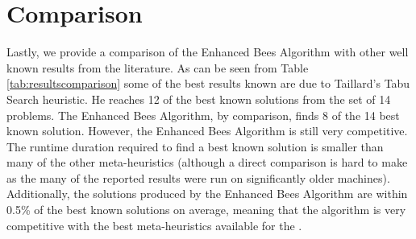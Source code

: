 \section{Comparison}
\label{sec:comparison}

Lastly, we provide a comparison of the Enhanced Bees Algorithm with other well known results from the literature. As can be seen from Table \ref{tab:resultscomparison} some of the best results known are due to Taillard's Tabu Search heuristic. He reaches 12 of the best known solutions from the set of 14 problems. The Enhanced Bees Algorithm, by comparison, finds 8 of the 14 best known solution. However, the Enhanced Bees Algorithm is still very competitive. The runtime duration required to find a best known solution is smaller than many of the other meta-heuristics (although a direct comparison is hard to make as the many of the reported results were run on significantly older machines). Additionally, the solutions produced by the Enhanced Bees Algorithm are within 0.5\% of the best known solutions on average, meaning that the algorithm is very competitive with the best meta-heuristics available for the \VRP.

